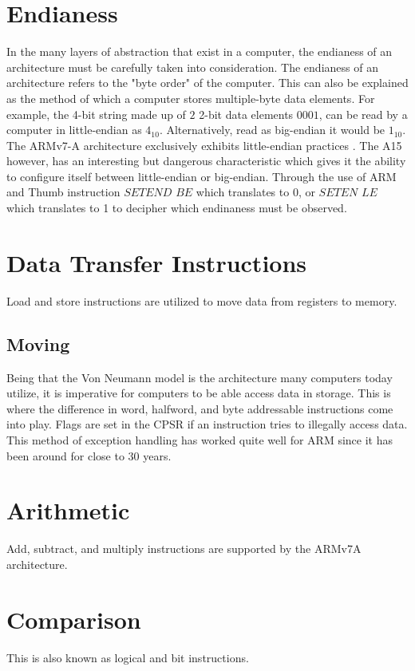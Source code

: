 \documentclass[12pt]{scrreprt}
\begin{document}
	\section{Endianess}
	In the many layers of abstraction that exist in a computer, the endianess of an architecture must be carefully taken into consideration.
	The endianess of an architecture refers to the "byte order" of the computer.
	This can also be explained as the method of which a computer stores multiple-byte data elements.
	For example, the 4-bit string made up of $2$ 2-bit data elements $0001$, can be read by a computer in little-endian as $4_{10}$. 
	Alternatively, read as big-endian it would be $1_{10}$.
	The ARMv7-A architecture exclusively exhibits little-endian practices \autocite[A2-53]{a7man}.
	The A15 however, has an interesting but dangerous characteristic which gives it the ability to configure itself between little-endian or big-endian.
	Through the use of ARM and Thumb instruction $SETEND$ $BE$ which translates to 0, or $SETEN$ $LE$ which translates to 1 to decipher which endinaness must be observed.

	\section{Data Transfer Instructions}
	Load and store instructions are utilized to move data from registers to memory.

	\subsection{Moving}
	Being that the Von Neumann model is the architecture many computers today utilize, it is imperative for computers to be able access data in storage.
	This is where the difference in word, halfword, and byte addressable instructions come into play.
	Flags are set in the CPSR if an instruction tries to illegally access data.
	This method of exception handling has worked quite well for ARM since it has been around for close to 30 years.

	\section{Arithmetic}
		Add, subtract, and multiply instructions are supported by the ARMv7A architecture.
	\section{Comparison}
		This is also known as logical and bit instructions.
\end{document}
